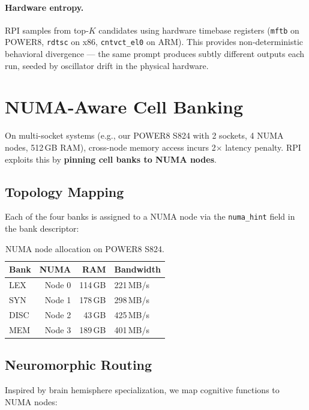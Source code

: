 \documentclass[10pt,twocolumn]{article}
\begin{document}
\paragraph{Hardware entropy.} RPI samples from top-$K$ candidates using hardware timebase registers (\texttt{mftb} on POWER8, \texttt{rdtsc} on x86, \texttt{cntvct\_el0} on ARM). This provides non-deterministic behavioral divergence --- the same prompt produces subtly different outputs each run, seeded by oscillator drift in the physical hardware.

\section{NUMA-Aware Cell Banking}
\label{sec:numa}

On multi-socket systems (e.g., our POWER8 S824 with 2 sockets, 4 NUMA nodes, 512\,GB RAM), cross-node memory access incurs 2$\times$ latency penalty. RPI exploits this by \textbf{pinning cell banks to NUMA nodes}.

\subsection{Topology Mapping}

Each of the four banks is assigned to a NUMA node via the \texttt{numa\_hint} field in the bank descriptor:

\begin{table}[h]
\centering
\small
\begin{tabular}{lrrl}
\toprule
\textbf{Bank} & \textbf{NUMA} & \textbf{RAM} & \textbf{Bandwidth} \\
\midrule
LEX & Node 0 & 114\,GB & 221\,MB/s \\
SYN & Node 1 & 178\,GB & 298\,MB/s \\
DISC & Node 2 & 43\,GB & 425\,MB/s \\
MEM & Node 3 & 189\,GB & 401\,MB/s \\
\bottomrule
\end{tabular}
\caption{NUMA node allocation on POWER8 S824.}
\label{tab:numa}
\end{table}

\subsection{Neuromorphic Routing}

Inspired by brain hemisphere specialization, we map cognitive functions to NUMA nodes:
\end{document}
